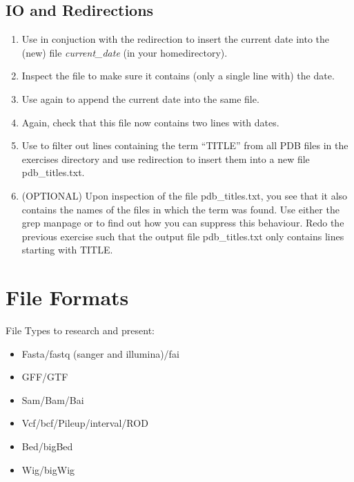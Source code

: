 \documentclass[a4paper,11pt,english]{sphinxmanual}
\begin{document}
\section{IO and Redirections}
\label{exercises/exercises_beginner:io-and-redirections}\begin{enumerate}
\item {} 
Use  in conjuction with the redirection to insert the current date into the (new) file \emph{current\_date} (in your homedirectory).

\item {} 
Inspect the file to make sure it contains (only a single line with) the date.

\item {} 
Use  again to append the current date into the same file.

\item {} 
Again, check that this file now contains two lines with dates.

\item {} 
Use  to filter out lines containing the term ``TITLE'' from all PDB files in the exercises directory and use redirection to insert them into a new file pdb\_titles.txt.

\item {} 
(OPTIONAL) Upon inspection of the file pdb\_titles.txt, you see that it also contains the names of the files in which the term was found.
Use either the grep manpage or  to find out how you can suppress this behaviour.
Redo the previous exercise such that the output file pdb\_titles.txt only contains lines starting with TITLE.

\end{enumerate}


\chapter{File Formats}
\label{exercises/known_file_formats:file-formats}\label{exercises/known_file_formats::doc}
File Types to research and present:
\begin{itemize}
\item {} 
Fasta/fastq (sanger and illumina)/fai

\item {} 
GFF/GTF

\item {} 
Sam/Bam/Bai

\item {} 
Vcf/bcf/Pileup/interval/ROD

\item {} 
Bed/bigBed

\item {} 
Wig/bigWig

\end{itemize}
\end{document}
